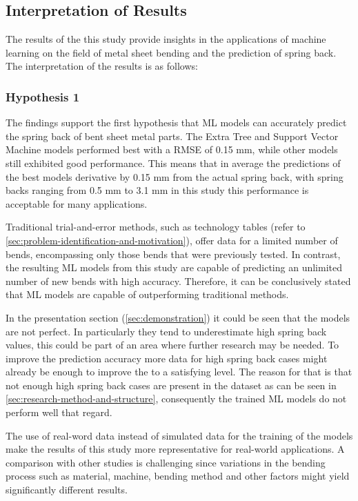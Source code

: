 \subsection{Interpretation of Results}\label{subsec:interpretation-of-results}

The results of the this study provide insights in the applications of machine learning on the field of metal sheet
bending and the prediction of spring back.
The interpretation of the results is as follows:

\subsubsection{Hypothesis 1}
The findings support the first hypothesis that \ac{ML} models can accurately predict the spring back of bent sheet
metal parts.
The Extra Tree and Support Vector Machine models performed best with a RMSE of 0.15 mm, while other models still
exhibited good performance.
This means that in average the predictions of the best models derivative by 0.15 mm from the actual spring back,
with spring backs ranging from 0.5 mm to 3.1 mm in this study this performance is acceptable for many applications.

Traditional trial-and-error methods, such as technology tables (refer to
\cref{sec:problem-identification-and-motivation}), offer data for a limited number of bends, encompassing
only those bends that were previously tested.
In contrast, the resulting \ac{ML} models from this study are capable of predicting an unlimited number of new bends
with high accuracy.
Therefore, it can be conclusively stated that \ac{ML} models are capable of outperforming traditional methods.

In the presentation section (\cref{sec:demonstration}) it could be seen that the models are not perfect.
In particularly they tend to underestimate high spring back values, this could be part of an area where further research
may be needed.
To improve the prediction accuracy more data for high spring back cases might already be enough to improve the to a
satisfying level.
The reason for that is that not enough high spring back cases are present in the dataset as can be seen in
\cref{sec:research-method-and-structure}, consequently the trained ML models do not perform well that regard.

The use of real-word data instead of simulated data for the training of the models make the results of this study more
representative for real-world applications.
A comparison with other studies is challenging since variations in the bending process such as material, machine,
bending method and other factors might yield significantly different results.


